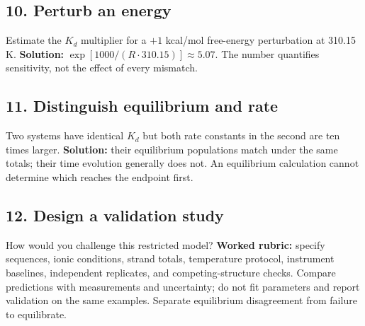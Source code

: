 \subsection*{10. Perturb an energy}
Estimate the $K_d$ multiplier for a $+1$ kcal/mol free-energy perturbation
at 310.15 K. \textbf{Solution:} $\exp[1000/(R\cdot310.15)]\approx5.07$.
The number quantifies sensitivity, not the effect of every mismatch.

\subsection*{11. Distinguish equilibrium and rate}
Two systems have identical $K_d$ but both rate constants in the second
are ten times larger. \textbf{Solution:} their equilibrium populations
match under the same totals; their time evolution generally does not.
An equilibrium calculation cannot determine which reaches the endpoint first.

\subsection*{12. Design a validation study}
How would you challenge this restricted model?
\textbf{Worked rubric:} specify sequences, ionic conditions, strand totals,
temperature protocol, instrument baselines, independent replicates, and
competing-structure checks. Compare predictions with measurements and
uncertainty; do not fit parameters and report validation on the same examples.
Separate equilibrium disagreement from failure to equilibrate.
